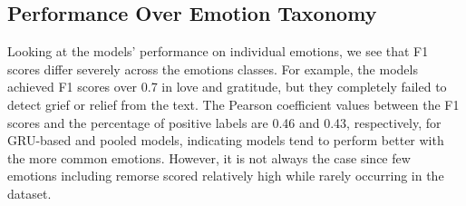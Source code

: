 \documentclass[conference]{IEEEtran}
\begin{document}
\subsection{Performance Over Emotion Taxonomy}

Looking at the models' performance on individual emotions, we see that F1 scores differ severely across the emotions classes. For example, the models achieved F1 scores over 0.7 in love and gratitude, but they completely failed to detect grief or relief from the text. The Pearson coefficient values between the F1 scores and the percentage of positive labels are 0.46 and 0.43, respectively, for GRU-based and pooled models, indicating models tend to perform better with the more common emotions. However, it is not always the case since few emotions including remorse scored relatively high while rarely occurring in the dataset. 
\end{document}
